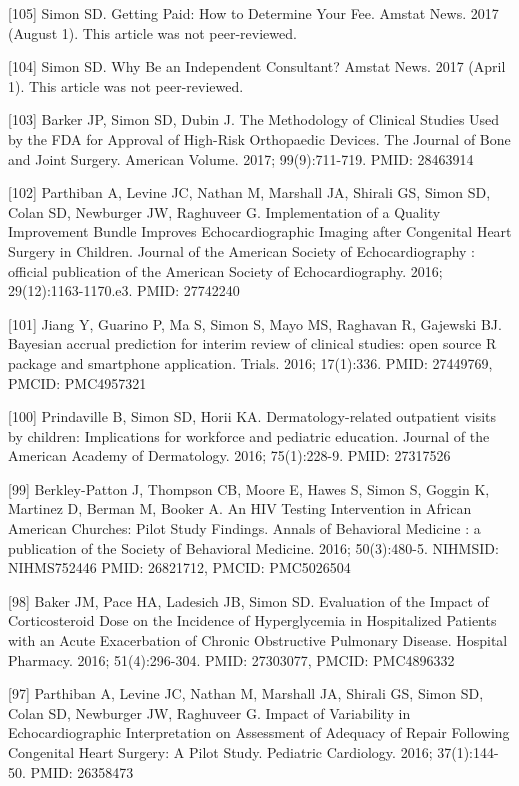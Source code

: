 \documentclass[
  12pt,
]{article}
\begin{document}
{[}105{]} Simon SD. Getting Paid: How to Determine Your Fee. Amstat
News. 2017 (August 1). This article was not peer-reviewed.

{[}104{]} Simon SD. Why Be an Independent Consultant? Amstat News. 2017
(April 1). This article was not peer-reviewed.

{[}103{]} Barker JP, Simon SD, Dubin J. The Methodology of Clinical
Studies Used by the FDA for Approval of High-Risk Orthopaedic Devices.
The Journal of Bone and Joint Surgery. American Volume. 2017;
99(9):711-719. PMID: 28463914

{[}102{]} Parthiban A, Levine JC, Nathan M, Marshall JA, Shirali GS,
Simon SD, Colan SD, Newburger JW, Raghuveer G. Implementation of a
Quality Improvement Bundle Improves Echocardiographic Imaging after
Congenital Heart Surgery in Children. Journal of the American Society of
Echocardiography : official publication of the American Society of
Echocardiography. 2016; 29(12):1163-1170.e3. PMID: 27742240

{[}101{]} Jiang Y, Guarino P, Ma S, Simon S, Mayo MS, Raghavan R,
Gajewski BJ. Bayesian accrual prediction for interim review of clinical
studies: open source R package and smartphone application. Trials. 2016;
17(1):336. PMID: 27449769, PMCID: PMC4957321

{[}100{]} Prindaville B, Simon SD, Horii KA. Dermatology-related
outpatient visits by children: Implications for workforce and pediatric
education. Journal of the American Academy of Dermatology. 2016;
75(1):228-9. PMID: 27317526

{[}99{]} Berkley-Patton J, Thompson CB, Moore E, Hawes S, Simon S,
Goggin K, Martinez D, Berman M, Booker A. An HIV Testing Intervention in
African American Churches: Pilot Study Findings. Annals of Behavioral
Medicine : a publication of the Society of Behavioral Medicine. 2016;
50(3):480-5. NIHMSID: NIHMS752446 PMID: 26821712, PMCID: PMC5026504

{[}98{]} Baker JM, Pace HA, Ladesich JB, Simon SD. Evaluation of the
Impact of Corticosteroid Dose on the Incidence of Hyperglycemia in
Hospitalized Patients with an Acute Exacerbation of Chronic Obstructive
Pulmonary Disease. Hospital Pharmacy. 2016; 51(4):296-304. PMID:
27303077, PMCID: PMC4896332

{[}97{]} Parthiban A, Levine JC, Nathan M, Marshall JA, Shirali GS,
Simon SD, Colan SD, Newburger JW, Raghuveer G. Impact of Variability in
Echocardiographic Interpretation on Assessment of Adequacy of Repair
Following Congenital Heart Surgery: A Pilot Study. Pediatric Cardiology.
2016; 37(1):144-50. PMID: 26358473
\end{document}
